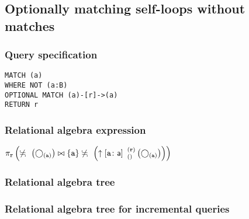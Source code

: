 \subsection{Optionally matching self-loops without matches}

\subsubsection*{Query specification}

\begin{lstlisting}
MATCH (a)
WHERE NOT (a:B)
OPTIONAL MATCH (a)-[r]->(a)
RETURN r
\end{lstlisting}

\subsubsection*{Relational algebra expression}

$\projection{\var{r}} \left(\alldifferent{} \left(\getvertices{a}{}\right) \join \{\var{a}\} \alldifferent{} \left(\expandout{a}{a}{}{r}{} \left(\getvertices{a}{}\right)\right)\right)$

\subsubsection*{Relational algebra tree}


\subsubsection*{Relational algebra tree for incremental queries}


